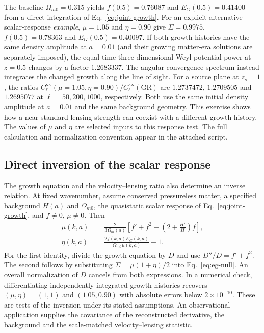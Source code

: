 The baseline $\Omega_{m0}=0.315$ yields $f(0.5)=0.76087$ and $E_G(0.5)=0.41400$ from a direct integration of Eq.~\eqref{eq:joint-growth}. For an explicit alternative scalar-response \emph{example}, $\mu=1.05$ and $\eta=0.90$ give $\Sigma=0.9975$, $f(0.5)=0.78363$ and $E_G(0.5)=0.40097$. If both growth histories have the same density amplitude at $a=0.01$ (and their growing matter-era solutions are separately imposed), the equal-time three-dimensional Weyl-potential power at $z=0.5$ changes by a factor $1.2683337$. The angular convergence spectrum instead integrates the changed growth along the line of sight. For a source plane at $z_s=1$, the ratios $C_\ell^{\kappa\kappa}(\mu=1.05,\eta=0.90)/C_\ell^{\kappa\kappa}(\mathrm{GR})$ are $1.2737472$, $1.2709505$ and $1.2695077$ at $\ell=50,200,1000$, respectively. Both use the same initial density amplitude at $a=0.01$ and the same background geometry. This exercise shows how a near-standard lensing strength can coexist with a different growth history. The values of $\mu$ and $\eta$ are selected inputs to this response test. The full calculation and normalization convention appear in the attached script.


\subsection{Direct inversion of the scalar response}
\label{sec:growth-inversion}
The growth equation and the velocity--lensing ratio also determine an inverse relation. At fixed wavenumber, assume conserved pressureless matter, a specified background $H(a)$ and $\Omega_{m0}$, the quasistatic scalar response of Eq.~\eqref{eq:joint-growth}, and $f\neq0$, $\mu\neq0$. Then
\begin{equation}\label{eq:growth-inversion}
\boxed{\begin{aligned}
\mu(k,a)&=\frac{2}{3\Omega_m(a)}
\left[f'+f^2+\left(2+\frac{H'}H\right)f\right],\\
\eta(k,a)&=\frac{2f(k,a)E_G(k,a)}{\Omega_{m0}\mu(k,a)}-1.
\end{aligned}}
\end{equation}
For the first identity, divide the growth equation by $D$ and use $D''/D=f'+f^2$. The second follows by substituting $\Sigma=\mu(1+\eta)/2$ into Eq.~\eqref{eq:eg-null}. An overall normalization of $D$ cancels from both expressions. In a numerical check, differentiating independently integrated growth histories recovers $(\mu,\eta)=(1,1)$ and $(1.05,0.90)$ with absolute errors below $2\times10^{-10}$. These are tests of the inversion under its stated assumptions. An observational application supplies the covariance of the reconstructed derivative, the background and the scale-matched velocity--lensing statistic.
